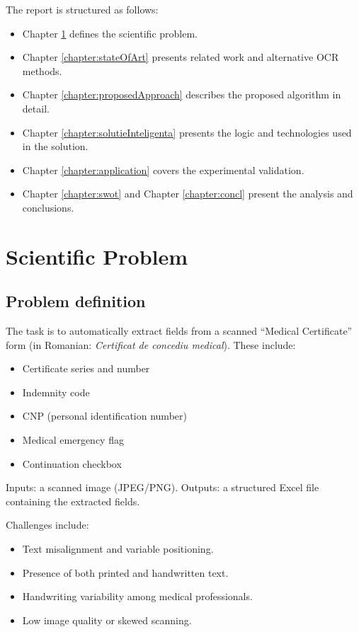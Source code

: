 \documentclass[runningheads,a4paper,11pt]{report}
\begin{document}
The report is structured as follows:
\begin{itemize}
\item Chapter \ref{section:scientificProblem} defines the scientific problem.
\item Chapter \ref{chapter:stateOfArt} presents related work and alternative OCR methods.
\item Chapter \ref{chapter:proposedApproach} describes the proposed algorithm in detail.
\item Chapter \ref{chapter:solutieInteligenta} presents the logic and technologies used in the solution.
\item Chapter \ref{chapter:application} covers the experimental validation.
\item Chapter \ref{chapter:swot} and Chapter \ref{chapter:concl} present the analysis and conclusions.
\end{itemize}

\chapter{Scientific Problem}
\label{section:scientificProblem}

\section{Problem definition}
The task is to automatically extract fields from a scanned ``Medical Certificate'' form (in Romanian: \textit{Certificat de concediu medical}). These include:
\begin{itemize}
\item Certificate series and number
\item Indemnity code
\item CNP (personal identification number)
\item Medical emergency flag
\item Continuation checkbox
\end{itemize}

Inputs: a scanned image (JPEG/PNG).  
Outputs: a structured Excel file containing the extracted fields.

Challenges include:
\begin{itemize}
\item Text misalignment and variable positioning.
\item Presence of both printed and handwritten text.
\item Handwriting variability among medical professionals.
\item Low image quality or skewed scanning.
\end{itemize}
\end{document}
